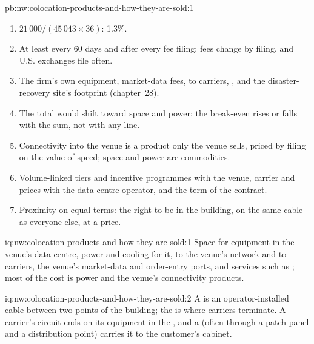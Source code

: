 \begin{solution}{pb:nw:colocation-products-and-how-they-are-sold:1}
\begin{enumerate}
\item $21\,000 / (45\,043 \times 36)$: 1.3\%.
\item At least every 60 days and after every fee filing: fees change by filing, and U.S. exchanges file often.
\item The firm's own equipment, market-data fees,  to carriers, , and the disaster-recovery site's footprint
  (chapter~28).
\item The total would shift toward space and power; the break-even rises or falls with the sum, not with any line.
\item Connectivity into the venue is a product only the venue sells, priced by filing on the value of speed; space and power are commodities.
\item Volume-linked tiers and incentive programmes with the venue, carrier and  prices with the data-centre operator, and the
  term of the contract.
\item Proximity on equal terms: the right to be in the building, on the same cable as everyone else, at a price.
\end{enumerate}
\end{solution}

\begin{solution}{iq:nw:colocation-products-and-how-they-are-sold:1}
Space for equipment in the venue's data centre, power and cooling for it,  to the venue's network and to carriers, the venue's
market-data and order-entry ports, and services such as ; most of the cost is power and the venue's connectivity products.
\end{solution}

\begin{solution}{iq:nw:colocation-products-and-how-they-are-sold:2}
A  is an operator-installed cable between two points of the building; the  is where carriers terminate. A carrier's
circuit ends on its equipment in the , and a  (often through a patch panel and a distribution point) carries it to
the customer's cabinet.
\end{solution}

